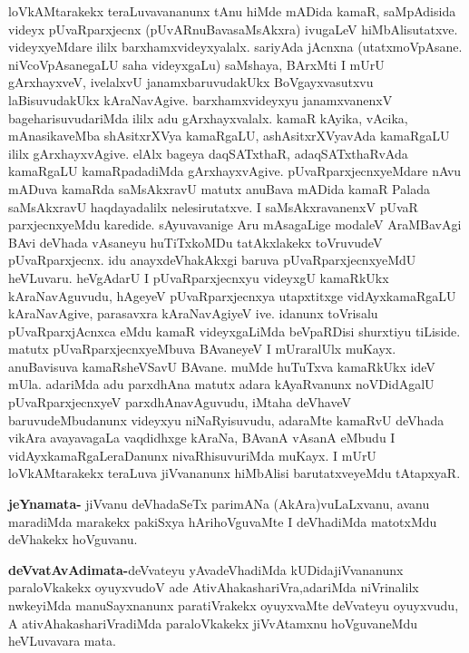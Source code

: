 \begin{artha}
loVkAMtarakekx teraLuvavananunx tAnu hiMde mADida kamaR, saMpAdisida videyx pUvaRparxjecnx (pUvARnuBavasaMsAkxra) ivugaLeV hiMbAlisutatxve. videyxyeMdare ililx barxhamxvideyxyalalx. sariyAda jAcnxna (utatxmoVpAsane. niVcoVpAsanegaLU saha videyxgaLu) saMshaya, BArxMti I mUrU gArxhayxveV, ivelalxvU janamxbaruvudakUkx BoVgayxvasutxvu laBisuvudakUkx kAraNavAgive. barxhamxvideyxyu janamxvanenxV bageharisuvudariMda ililx adu gArxhayxvalalx.  kamaR kAyika, vAcika, mAnasikaveMba shAsitxrXVya kamaRgaLU, ashAsitxrXVyavAda kamaRgaLU ililx gArxhayxvAgive. elAlx bageya daqSATxthaR, adaqSATxthaRvAda kamaRgaLU kamaRpadadiMda gArxhayxvAgive. pUvaRparxjecnxyeMdare nAvu mADuva kamaRda saMsAkxravU matutx anuBava mADida kamaR Palada saMsAkxravU haqdayadalilx nelesirutatxve. I saMsAkxravanenxV pUvaR parxjecnxyeMdu karedide. sAyuvavanige Aru mAsagaLige modaleV AraMBavAgi BAvi deVhada vAsaneyu huTiTxkoMDu tatAkxlakekx toVruvudeV pUvaRparxjecnx. idu anayxdeVhakAkxgi baruva pUvaRparxjecnxyeMdU heVLuvaru. heVgAdarU I pUvaRparxjecnxyu videyxgU kamaRkUkx kAraNavAguvudu, hAgeyeV pUvaRparxjecnxya utapxtitxge vidAyxkamaRgaLU kAraNavAgive, parasavxra kAraNavAgiyeV ive. idanunx toVrisalu pUvaRparxjAcnxca eMdu kamaR videyxgaLiMda beVpaRDisi shurxtiyu tiLiside. matutx pUvaRparxjecnxyeMbuva BAvaneyeV I mUraralUlx muKayx. anuBavisuva kamaRsheVSavU BAvane. muMde huTuTxva kamaRkUkx ideV mUla. adariMda adu parxdhAna matutx adara kAyaRvanunx noVDidAgalU pUvaRparxjecnxyeV parxdhAnavAguvudu, iMtaha deVhaveV baruvudeMbudanunx videyxyu niNaRyisuvudu, adaraMte kamaRvU deVhada vikAra avayavagaLa vaqdidhxge kAraNa, BAvanA vAsanA eMbudu I vidAyxkamaRgaLeraDanunx nivaRhisuvuriMda muKayx. I mUrU loVkAMtarakekx teraLuva jiVvananunx hiMbAlisi barutatxveyeMdu tAtapxyaR.
\end{artha}



\begin{artha}
\textbf{jeYnamata-} jiVvanu deVhadaSeTx parimANa (AkAra)vuLaLxvanu, avanu maradiMda marakekx pakiSxya hArihoVguvaMte I deVhadiMda matotxMdu deVhakekx hoVguvanu.
\end{artha}

\begin{artha}
\textbf{deVvatAvAdimata-}deVvateyu yAvadeVhadiMda kUDida\break jiVvananunx paraloVkakekx oyuyxvudoV ade AtivAhakashariVra,\break adariMda niVrinalilx nwkeyiMda manuSayxnanunx paratiVrakekx oyuyxvaMte deVvateyu oyuyxvudu, A ativAhakashariVradiMda paraloVkakekx jiVvAtamxnu hoVguvaneMdu heVLuvavara mata.
\end{artha}

